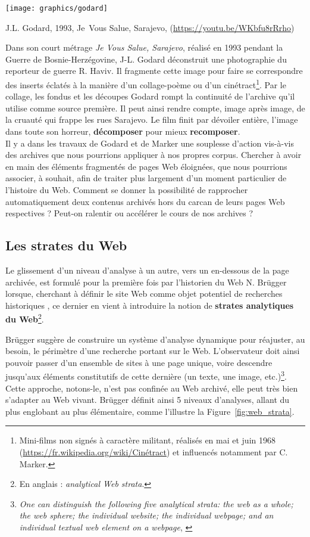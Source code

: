 \documentclass[symmetric,justified,marginals=raggedouter]{tufte-book}
\begin{document}
\begin{marginfigure}%
  \texttt{[image: graphics/godard]}
  \caption{J.L. Godard, 1993, Je~Vous Salue, Sarajevo, (\url{https://youtu.be/WKbfu8rRrho})}
  \label{fig:godard}
\end{marginfigure}

Dans son court métrage \textit{Je Vous Salue, Sarajevo}, réalisé en 1993 pendant la Guerre de Bosnie-Herzégovine, J-L. Godard déconstruit une photographie du reporteur de guerre R. Haviv. Il fragmente cette image pour faire se correspondre des inserts éclatés à la manière d'un collage-poème ou d'un cinétract\footnote{\RaggedOuter Mini-films non signés à caractère militant, réalisés en mai et juin 1968 (\url{https://fr.wikipedia.org/wiki/Cinétract}) et influencés notamment par C. Marker.}. Par le collage, les fondus et les découpes Godard rompt la continuité de l'archive qu'il utilise comme source première. Il peut ainsi rendre compte, image après image, de la cruauté qui frappe les rues Sarajevo. Le film finit par dévoiler entière, l'image dans toute son horreur, \textbf{décomposer} pour mieux \textbf{recomposer}.\\

\noindent Il y a dans les travaux de Godard et de Marker une souplesse d'action vis-à-vis des archives que nous pourrions appliquer à nos propres corpus. Chercher à avoir en main des éléments fragmentés de pages Web éloignées, que nous pourrions associer, à souhait, afin de traiter plus largement d'un moment particulier de l'histoire du Web. Comment se donner la possibilité de rapprocher automatiquement deux contenus archivés hors du carcan de leurs pages Web respectives ? Peut-on ralentir ou accélérer le cours de nos archives ? 

\subsection{Les strates du Web}

\noindent Le glissement d'un niveau d'analyse à un autre, vers un en-dessous de la page archivée, est formulé pour la première fois par l'historien du Web N. Brügger lorsque, cherchant à définir le site Web comme objet potentiel de recherches historiques \citep{brugger_website_2009}, ce dernier en vient à introduire la notion de \textbf{strates analytiques du Web}\footnote{\RaggedOuter En anglais : \textit{analytical Web strata}.}.

Brügger suggère de construire un système d'analyse dynamique pour réajuster, au besoin, le périmètre d'une recherche portant sur le Web. L'observateur doit ainsi pouvoir passer d'un ensemble de sites à une page unique, voire descendre jusqu'aux éléments constitutifs de cette dernière (un texte, une image, etc.)\footnote{\RaggedOuter \og\textit{One can distinguish the following five analytical strata: the web as a whole; the web sphere; the individual website; the individual webpage; and an individual textual web element on a webpage}\fg{}, \citep[p.10]{brugger_website_2009}}. 
Cette approche, notons-le, n'est pas confinée au Web archivé, elle peut très bien s'adapter au Web vivant. Brügger définit ainsi 5 niveaux d'analyses, allant du  plus englobant au plus élémentaire, comme l'illustre la Figure~\ref{fig:web_strata}.
\end{document}
